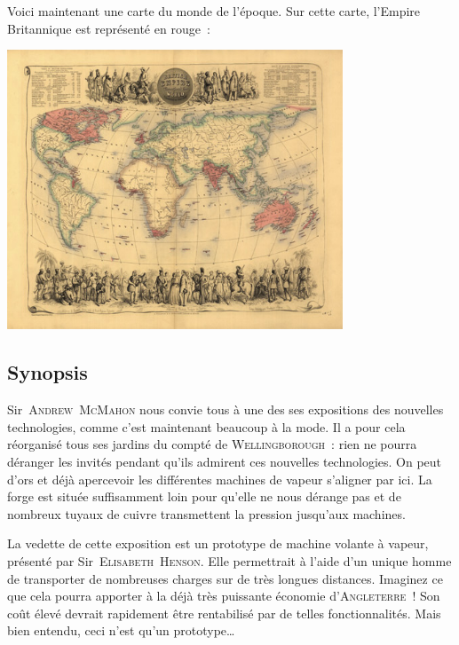 {%

Voici maintenant une carte du monde de l’époque.
Sur cette carte, l’Empire Britannique est représenté en rouge~:
\begin{center}
	\includegraphics[width = 10cm]{world.jpg}
\end{center}

\subsection{Synopsis}

Sir~\textsc{Andrew~McMahon} nous convie tous à une des ses expositions des nouvelles technologies, comme c’est maintenant beaucoup à la mode.
Il a pour cela réorganisé tous ses jardins du compté de \textsc{Wellingborough}~:  rien ne pourra déranger les invités pendant qu’ils admirent ces nouvelles technologies.
On peut d’ors et déjà apercevoir les différentes machines de vapeur s’aligner par ici.
La forge est située suffisamment loin pour qu’elle ne nous dérange pas et de nombreux tuyaux de cuivre transmettent la pression jusqu’aux machines.

La vedette de cette exposition est un prototype de machine volante à vapeur, présenté par Sir~\textsc{Elisabeth~Henson}.
Elle permettrait à l’aide d’un unique homme de transporter de nombreuses charges sur de très longues distances.
Imaginez ce que cela pourra apporter à la déjà très puissante économie d’\textsc{Angleterre}~!
Son coût élevé devrait rapidement être rentabilisé par de telles fonctionnalités.
Mais bien entendu, ceci n’est qu’un prototype…


}
